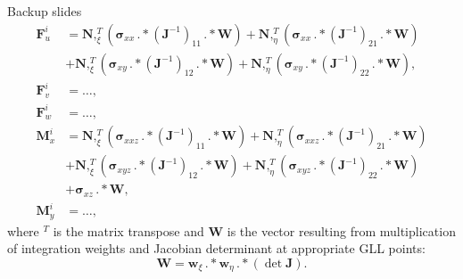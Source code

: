 \documentclass[10pt]{beamer} %
\renewcommand{\vec}[1]{\mathbf{#1}}
\newcommand{\bm}[1]{\mathbf{#1}}
\newcommand{\bs}[1]{\boldsymbol{#1}}
\begin{document}
\begin{frame}{Backup slides}
\begin{equation*}
\begin{split}
\vec{F}_u^i&=\bm{N},_{\xi}^T \left(\bs{\sigma}_{xx}\,.*(\vec{J}^{-1})_{11}\,.*\vec{W}\right)+\bm{N},_{\eta}^T \left(\bs{\sigma}_{xx}\,.*(\vec{J}^{-1})_{21}\,.*\vec{W}\right)\\
&+\bm{N},_{\xi}^T \left(\bs{\sigma}_{xy}\,.*(\vec{J}^{-1})_{12}\,.*\vec{W}\right)+\bm{N},_{\eta}^T \left(\bs{\sigma}_{xy}\,.*(\vec{J}^{-1})_{22}\,.*\vec{W}\right), \\ 
\vec{F}_v^i&=\ldots ,\\
\vec{F}_w^i&=\ldots ,\\
\vec{M}_x^i&=\bm{N},_{\xi}^T \left(\bs{\sigma}_{xxz}\,.*(\vec{J}^{-1})_{11}\,.*\vec{W}\right)+\bm{N},_{\eta}^T \left(\bs{\sigma}_{xxz}\,.*(\vec{J}^{-1})_{21}\,.*\vec{W}\right)\\
&+\bm{N},_{\xi}^T \left(\bs{\sigma}_{xyz}\,.*(\vec{J}^{-1})_{12}\,.*\vec{W}\right)+\bm{N},_{\eta}^T \left(\bs{\sigma}_{xyz}\,.*(\vec{J}^{-1})_{22}\,.*\vec{W}\right)\\
&+\bs{\sigma}_{xz}\,.*\vec{W},\\
\vec{M}_y^i&=\ldots ,
\label{eq:internal_forces}
\end{split}
\end{equation*}
where $^T$ is the matrix transpose and $\vec{W}$ is the vector resulting from multiplication of integration weights and Jacobian determinant at appropriate GLL points:
\begin{equation*}
\vec{W} = \vec{w}_{\xi}\,.*\vec{w}_{\eta}\,.*\left(\det\vec{J}\right).
\end{equation*}
\end{frame}
\end{document}
